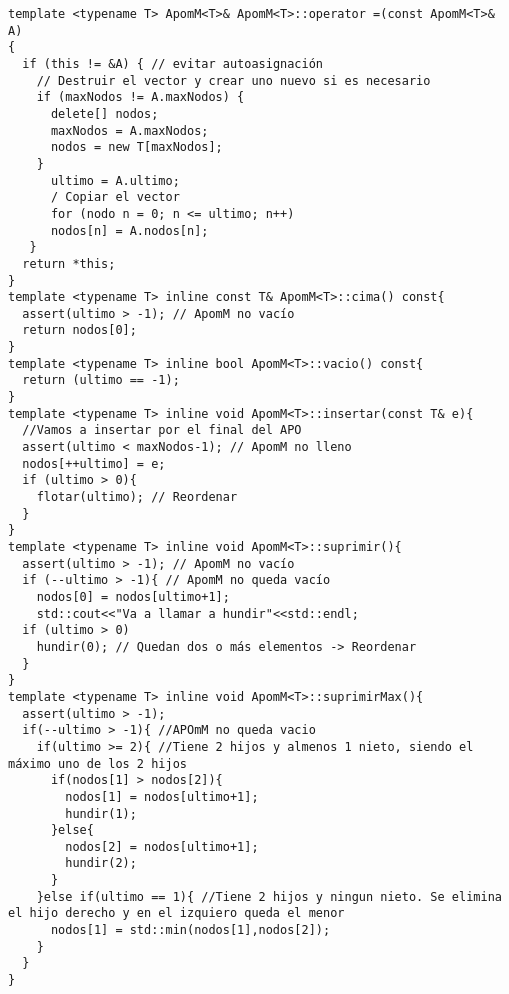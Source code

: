 \begin{verbatim}
template <typename T> ApomM<T>& ApomM<T>::operator =(const ApomM<T>& A)
{
  if (this != &A) { // evitar autoasignación
    // Destruir el vector y crear uno nuevo si es necesario
    if (maxNodos != A.maxNodos) {
      delete[] nodos;
      maxNodos = A.maxNodos;
      nodos = new T[maxNodos];
    }
      ultimo = A.ultimo;
      / Copiar el vector
      for (nodo n = 0; n <= ultimo; n++)
      nodos[n] = A.nodos[n];
   }
  return *this;
}
template <typename T> inline const T& ApomM<T>::cima() const{
  assert(ultimo > -1); // ApomM no vacío
  return nodos[0];
}
template <typename T> inline bool ApomM<T>::vacio() const{
  return (ultimo == -1);
}
template <typename T> inline void ApomM<T>::insertar(const T& e){
  //Vamos a insertar por el final del APO
  assert(ultimo < maxNodos-1); // ApomM no lleno
  nodos[++ultimo] = e;
  if (ultimo > 0){
    flotar(ultimo); // Reordenar
  }
}
template <typename T> inline void ApomM<T>::suprimir(){
  assert(ultimo > -1); // ApomM no vacío
  if (--ultimo > -1){ // ApomM no queda vacío
    nodos[0] = nodos[ultimo+1];
    std::cout<<"Va a llamar a hundir"<<std::endl;
  if (ultimo > 0)
    hundir(0); // Quedan dos o más elementos -> Reordenar
  }
}
template <typename T> inline void ApomM<T>::suprimirMax(){
  assert(ultimo > -1);
  if(--ultimo > -1){ //APOmM no queda vacio
    if(ultimo >= 2){ //Tiene 2 hijos y almenos 1 nieto, siendo el máximo uno de los 2 hijos
      if(nodos[1] > nodos[2]){
        nodos[1] = nodos[ultimo+1];
        hundir(1);
      }else{
        nodos[2] = nodos[ultimo+1];
        hundir(2);
      }
    }else if(ultimo == 1){ //Tiene 2 hijos y ningun nieto. Se elimina el hijo derecho y en el izquiero queda el menor
      nodos[1] = std::min(nodos[1],nodos[2]);
    }
  }
}


\end{verbatim}
